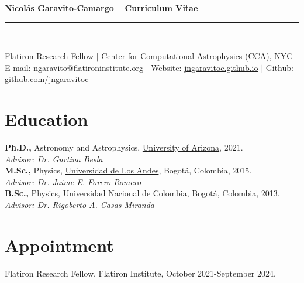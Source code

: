 \documentclass[UTF8]{article}
\begin{document}
\begin{center}
\indent \textbf{\LARGE Nicol\'as Garavito-Camargo -- Curriculum Vitae} \\
\indent \rule{17cm}{0.4pt}\\
\end{center}

\begin{center}
  Flatiron Research Fellow $|$ \href{https://www.simonsfoundation.org/flatiron/center-for-computational-astrophysics/} {Center for Computational Astrophysics
(CCA)}, NYC\\
E-mail: ngaravito@flatironinstitute.org $|$ Website:
\href{http://jngaravitoc.github.io/Garavito-Camargo}{jngaravitoc.github.io} $|$ Github: \href{http://www.github.com/jngaravitoc}{github.com/jngaravitoc}\\
\end{center}




\section*{Education}
\textbf{Ph.D.,} Astronomy and Astrophysics, \href{https://www.as.arizona.edu/}{University of Arizona}, 2021.\\
\indent \textit{Advisor: \href{https://sites.google.com/view/thebeslagroup/home}{Dr. Gurtina Besla}}\\
\textbf{M.Sc.,}  Physics, \href{https://fisica.uniandes.edu.co/en}{Universidad de Los Andes}, Bogot\'a, Colombia, 2015.\\
\indent \textit{Advisor: \href{http://wwwprof.uniandes.edu.co/~je.forero/}{Dr. Jaime E. Forero-Romero}}\\
\textbf{B.Sc.,} Physics,
\href{https://unal.edu.co/en.html}{Universidad Nacional de Colombia}, Bogot\'a, Colombia, 2013.\\
\indent \textit{Advisor:
\href{https://www.iau.org/administration/membership/individual/16146/}{Dr.
Rigoberto A. Casas Miranda}}


\section*{Appointment}
\indent Flatiron Research Fellow, Flatiron Institute, October 2021-September 2024.
\end{document}
